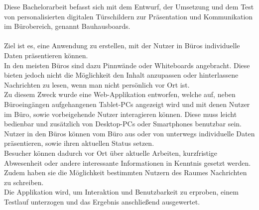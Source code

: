 Diese Bachelorarbeit befasst sich mit dem Entwurf, der Umsetzung und dem Test von personalisierten
digitalen Türschildern zur Präsentation und Kommunikation im Bürobereich, genannt
Bauhausboards.\\\\
Ziel ist es, eine Anwendung zu erstellen, mit der Nutzer in Büros individuelle Daten präsentieren können.\\
In den meisten Büros sind dazu Pinnwände oder Whiteboards angebracht. Diese bieten jedoch nicht die Möglichkeit den Inhalt anzupassen oder hinterlassene Nachrichten zu lesen, wenn man nicht persönlich vor Ort ist.\\
Zu diesem Zweck wurde eine Web-Applikation entworfen, welche auf, neben Büroeingängen aufgehangenen Tablet-PCs angezeigt wird und mit denen Nutzer im Büro, sowie vorbeigehende Nutzer interagieren können.
Diese muss leicht bedienbar und zusätzlich von Desktop-PCs oder Smartphones benutzbar sein.\\
Nutzer in den Büros können vom Büro aus oder von unterwegs individuelle Daten präsentieren, sowie ihren aktuellen Status setzen.\\
Besucher können dadurch vor Ort über aktuelle Arbeiten, kurzfristige Abwesenheit oder andere interessante Informationen in Kenntnis gesetzt werden. Zudem haben sie die Möglichkeit bestimmten Nutzern des Raumes Nachrichten zu schreiben.\\
Die Applikation wird, um Interaktion und Benutzbarkeit zu erproben, einem Testlauf unterzogen und das Ergebnis anschließend ausgewertet.


